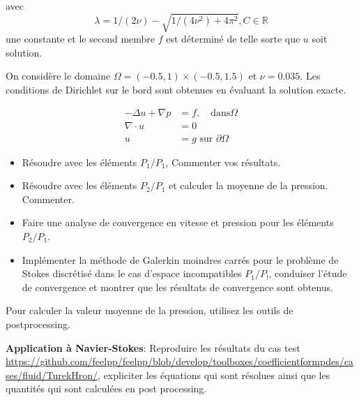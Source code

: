\documentclass[11pt,utf8]{article}
\begin{document}
avec $$\lambda=1 /(2 \nu)-\sqrt{1 /\left(4 \nu^{2}\right)+4 \pi^{2}}, C \in \mathbb{R}$$ une constante et le second membre $f$ est déterminé de telle sorte que $u$ soit solution.

On considère le domaine $\Omega=(-0.5,1) \times(-0.5,1.5)$ et $\nu=0.035 .$ Les conditions de Dirichlet sur le bord sont obtenues en évaluant la solution exacte.


 $$ \begin{aligned} -\Delta u+\nabla p&=f, \quad \text{dans} \Omega\\ \nabla \cdot u &=0 \\ u &=g \text{ sur } \partial \Omega \end{aligned}$$

  \begin{itemize}
    \item Résoudre avec les éléments $P_{1} / P_{1}$, Commenter vos résultats.

    \item Résoudre avec les éléments $P_{2} / P_{1}$ et calculer la moyenne de la pression. Commenter.
  
    \item Faire une analyse de convergence en vitesse et pression pour les éléments $P_{2} / P_{1}$.


    \item Implémenter la méthode de Galerkin moindres carrés pour le problème de Stokes discrétisé dans le cas d'espace incompatibles $P_1/P_!$, conduiser l'étude de convergence et montrer que les résultats de convergence sont obtenus.


  \end{itemize}
  
Pour calculer la valeur moyenne de la pression, utilisez les outils de postprocessing.

\textbf{Application à Navier-Stokes}: Reproduire les résultats du cas test \url{https://github.com/feelpp/feelpp/blob/develop/toolboxes/coefficientformpdes/cases/fluid/TurekHron/}, expliciter les équations qui sont résolues ainsi que les quantités qui sont calculées en post processing.
\end{document}
